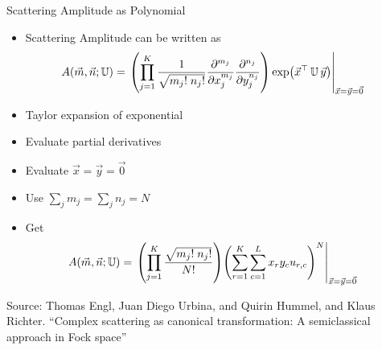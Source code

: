 \begin{frame}{Scattering Amplitude as Polynomial}
%
\begin{itemize}
\item Scattering Amplitude can be written as
	\begin{align*}
		A(\sysArgs)
	&=
		\eval{\qty(
			\prod_{j=1}^{K}
				\frac
					{1}
					{\sqrt{m_j! \; n_j!}}
				\pdv[m_j]{x_j}
				\pdv[n_j]{y_j}
			) \exp(\vec{x}\transp \, \mathbb{U} \, \vec{y})
		}_{\vec{x} = \vec{y} = \vec{0}}
	\end{align*}
\item Taylor expansion of exponential
\item Evaluate partial derivatives
\item Evaluate $\vec{x} = \vec{y} = \vec{0}$
\item Use $\sum_j m_j = \sum_j n_j = N$
\item Get
	\begin{align*}
		A(\sysArgs)
	&=
		\eval{
			\qty(
				\prod_{j=1}^{K}
					\frac
						{\sqrt{m_j! \; n_j!}}
						{N!}
			)
			\qty( 
				\sum_{r=1}^{K}
				\sum_{c=1}^{L}
					x_r
					y_c
					u_{r,c}
			)^N
		}_{\vec{x} = \vec{y} = \vec{0}}
	\end{align*}
\end{itemize}
%
\begin{minipage}{\linewidth}
\tiny
Source: Thomas Engl, Juan Diego Urbina, and Quirin Hummel, and Klaus Richter.
\enquote{Complex scattering as canonical transformation: A semiclassical approach in Fock space}
\end{minipage}
%
\end{frame}


